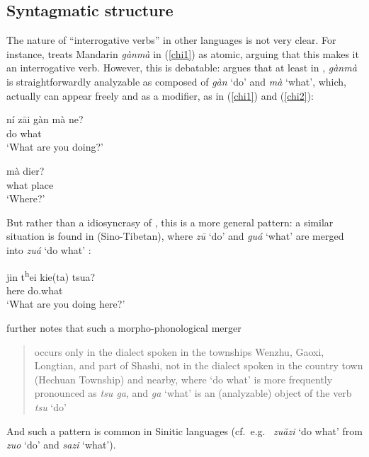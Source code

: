 \documentclass[output=paper]{langsci/langscibook}
\begin{document}
\subsection{Syntagmatic structure}\label{syntagmatic}

The nature of ``interrogative verbs'' in other languages is not very clear. For
instance, \citet[2]{hagege2008} treats Mandarin \emph{gànmà} in (\ref{chi1}) as atomic, arguing that this makes it an interrogative verb. However, this is debatable: \citet[169]{luo2016} argues that at least in , \emph{g\`anm\`a} is straightforwardly analyzable as composed of \emph{g\`an} `do' and \emph{m\`a} `what', which, actually can appear freely and as a modifier, as in (\ref{chi1}) and (\ref{chi2}):
\begin{exe}
\ex \label{chi1} 
\sn\gll n\'i z\={a}i g\`an m\`a ne?\\
\Ssg{} \Prog{} do what \glossQ{}\\
\glt `What are you doing?'

\ex \label{chi2} 
\sn\gll m\`a dier?\\
what place\\
\glt `Where?'
\end{exe}

But rather than a idiosyncrasy of , this is a more
general pattern: a similar situation is found in  (Sino-Tibetan),
where \emph{z\={u}} `do' and \emph{gu\'a} `what' are merged into \emph{zu\'a}
`do what' \citep[170]{luo2016}:

\begin{exe}
\ex \label{yg}  
\sn\gll jin t\textctc\textsuperscript{h}ei kie(ta\ng) tsua?\\
    \Ssg{} \Prog{} here do.what\\
\glt `What are you doing here?'
\end{exe}

\citet[170, 5n. 7]{luo2016} further notes that such a morpho-phonological
merger \blockquote{occurs only in the dialect spoken in the townships Wenzhu,
    Gaoxi, Longtian, and part of Shashi, not in the dialect spoken in the
    country town (Hechuan Township) and nearby, where `do what' is more
frequently pronounced as \emph{tsu ga}, and \emph{ga} `what' is an (analyzable)
object of the verb \emph{tsu} `do'}. And such a pattern is common in Sinitic
languages (cf.\ e.g.\  \emph{zu\u azi} `do what' from
\emph{zuo} `do' and \emph{sazi} `what').
\end{document}
